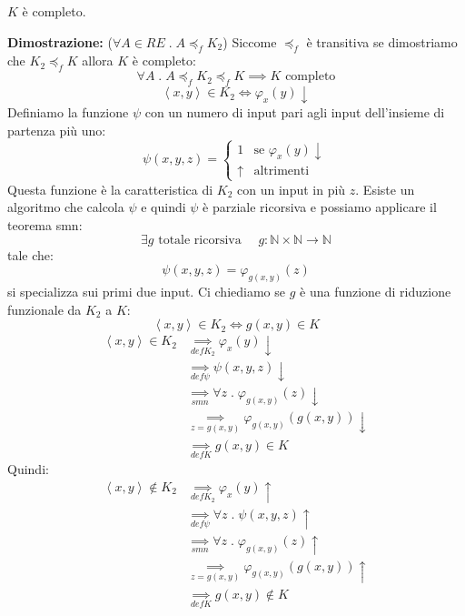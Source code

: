 \documentclass[a4paper]{article}
\begin{document}
\begin{theorem}
  \( K \) è completo.

  \vspace{1em}
  \noindent
  \textbf{Dimostrazione:}
  (\( \forall A \in RE \;.\; A \preceq_f K_2 \))
  Siccome \( \preceq_f \) è transitiva se dimostriamo che \( K_2 \preceq_f K \)
  allora \( K \) è completo:
  \[
    \forall A \;.\; A \preceq_f K_2 \preceq_f K \implies K \text{ completo}
  \] 
  \[
    \left<x, y \right> \in K_2 \iff \varphi_x(y) \downarrow
  \] 
  Definiamo la funzione \( \psi \) con un numero di input pari agli input dell'insieme
  di partenza più uno:
  \[
    \psi(x, y, z) =
    \begin{cases}
      1 & \text{se } \varphi_x(y) \downarrow \\
      \uparrow & \text{altrimenti}
    \end{cases}
  \] 
  Questa funzione è la caratteristica di \( K_2 \) con un input in più \( z \).
  Esiste un algoritmo che calcola \( \psi \) e quindi \( \psi \) è parziale ricorsiva
  e possiamo applicare il teorema smn:
  \[
    \exists g \text{ totale ricorsiva } \quad g: \mathbb{N} \times \mathbb{N} \to \mathbb{N}
  \] 
  tale che:
  \[
    \psi(x,y,z) = \varphi_{g(x, y)}(z)
  \] 
  si specializza sui primi due input. Ci chiediamo se \( g \) è una funzione di
  riduzione funzionale da \( K_2 \) a \( K \):
  \[
   \left<x, y \right> \in K_2 \iff g(x, y) \in K
  \] 
  \[
    \begin{aligned}
      \left<x, y \right> \in K_2 &\underset{def K_2}{\implies} \varphi_x(y) \downarrow\\
                                 &\underset{def \psi}{\implies} \psi(x, y, z) \downarrow\\
                                 &\underset{smn}{\implies} \forall z \;.\; \varphi_{g(x, y)}(z) \downarrow\\
                                 &\underset{z = g(x,y)}{\implies} \varphi_{g(x, y)}(g(x, y)) \downarrow\\
                                 &\underset{def K}{\implies} g(x, y) \in K
    \end{aligned}
  \] 
  Quindi:
  \[
    \begin{aligned}
      \left<x, y \right> \notin K_2 &\underset{def K_2}{\implies} \varphi_x(y) \uparrow\\
                                    &\underset{def \psi}{\implies} \forall z \;.\; \psi(x, y, z) \uparrow\\
                                    &\underset{smn}{\implies} \forall z \;.\; \varphi_{g(x, y)}(z) \uparrow\\
                                    &\underset{z = g(x,y)}{\implies} \varphi_{g(x, y)}(g(x, y)) \uparrow\\
                                    &\underset{def K}{\implies} g(x, y) \notin K
    \end{aligned}
  \] 
\end{theorem}
\end{document}
